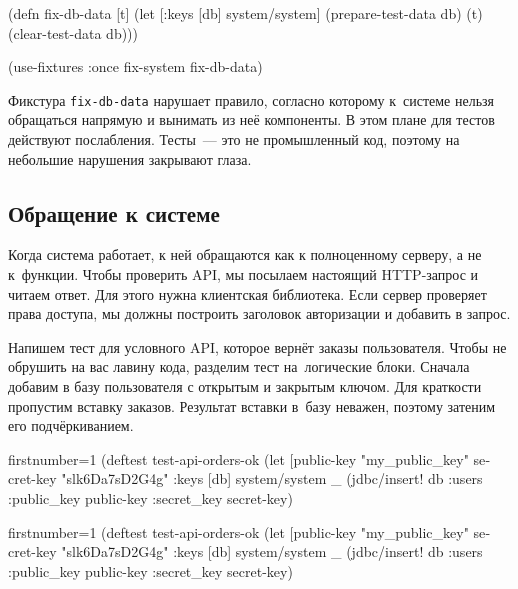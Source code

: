 \else

\begin{english}
  \begin{clojure}
(defn fix-db-data
  [t]
  (let [{:keys [db]} system/system]
    (prepare-test-data db)
    (t)
    (clear-test-data db)))

(use-fixtures :once fix-system fix-db-data)
  \end{clojure}
\end{english}

\fi

Фикстура \verb|fix-db-data| нарушает правило, согласно которому к~системе нельзя
обращаться напрямую и вынимать из неё компоненты. В этом плане для тестов
действуют послабления. Тесты~--- это не промышленный код, поэтому на небольшие
нарушения закрывают глаза.

\subsection{Обращение к системе}

Когда система работает, к ней обращаются как к полноценному серверу, а не к~функции.
Чтобы проверить API, мы посылаем настоящий HTTP-запрос и читаем
ответ. Для этого нужна клиентская библиотека. Если сервер проверяет права
доступа, мы должны построить заголовок авторизации и добавить в запрос.

Напишем тест для условного API, которое вернёт заказы пользователя. Чтобы не
обрушить на вас лавину кода, разделим тест на~логические блоки. Сначала добавим
в базу пользователя с открытым и закрытым ключом. Для краткости пропустим
вставку заказов. Результат вставки в~базу неважен, поэтому затеним его
подчёркиванием.

\ifx\devicetype\mobile

\begin{english}
  \begin{clojure/lines*}{firstnumber=1}
(deftest test-api-orders-ok
  (let [public-key "my_public_key"
        secret-key "slk6Da7sD2G4g"
        {:keys [db]} system/system
        _ (jdbc/insert! db :users
            {:public_key public-key
             :secret_key secret-key})
  \end{clojure/lines*}
\end{english}

\else

\begin{english}
  \begin{clojure/lines*}{firstnumber=1}
(deftest test-api-orders-ok
  (let [public-key "my_public_key"
        secret-key "slk6Da7sD2G4g"
        {:keys [db]} system/system
        _ (jdbc/insert! db :users {:public_key public-key
                                   :secret_key secret-key})
  \end{clojure/lines*}
\end{english}

